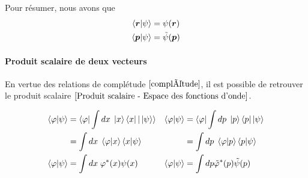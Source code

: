 \documentclass[../notesdecours.tex]{subfiles}
\begin{document}
Pour résumer, nous avons que 
\begin{align}
\braket{\bm{r}|\psi} &= \psi(\bm{r})\\
\braket{\bm{p}|\psi} &= \tilde{\psi}(\bm{p})
\end{align}
\paragraph{Produit scalaire de deux vecteurs}
En vertue des relations de complétude $\ref{complétude}$, il est possible de retrouver le produit scalaire $\eqref{Produit scalaire - Espace des fonctions d'onde}$.

\begin{align}
\braket{\varphi|\psi} &= \braket{\varphi|\int dx \; \ket{x}\bra{x}|\ket{\psi}} & \braket{\varphi|\psi} &= \braket{\varphi|\int dp \; \ket{p}\bra{p}|\psi}\notag\\
&= \int dx \; \braket{\varphi|x}\braket{x|\psi} & &= \int dp \; \braket{\varphi|p}\braket{p|\psi}\notag\\
\braket{\varphi|\psi} &= \int dx \; \varphi^*(x) \psi (x) & \braket{\varphi|\psi} &= \int dp \tilde{\varphi}^* (p) \tilde{\psi}(p) 
\end{align}
\end{document}
